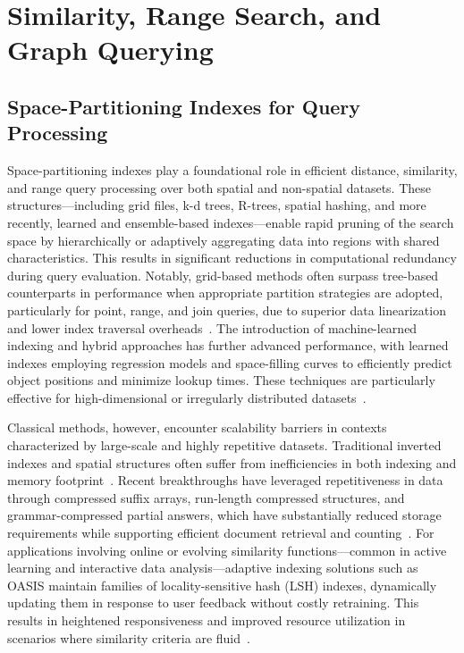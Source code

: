 \section{Similarity, Range Search, and Graph Querying}

\subsection{Space-Partitioning Indexes for Query Processing}

Space-partitioning indexes play a foundational role in efficient distance, similarity, and range query processing over both spatial and non-spatial datasets. These structures—including grid files, k-d trees, R-trees, spatial hashing, and more recently, learned and ensemble-based indexes—enable rapid pruning of the search space by hierarchically or adaptively aggregating data into regions with shared characteristics. This results in significant reductions in computational redundancy during query evaluation. Notably, grid-based methods often surpass tree-based counterparts in performance when appropriate partition strategies are adopted, particularly for point, range, and join queries, due to superior data linearization and lower index traversal overheads~\cite{ref31,ref35}. The introduction of machine-learned indexing and hybrid approaches has further advanced performance, with learned indexes employing regression models and space-filling curves to efficiently predict object positions and minimize lookup times. These techniques are particularly effective for high-dimensional or irregularly distributed datasets~\cite{ref35,ref51,ref54,ref111}.

Classical methods, however, encounter scalability barriers in contexts characterized by large-scale and highly repetitive datasets. Traditional inverted indexes and spatial structures often suffer from inefficiencies in both indexing and memory footprint~\cite{ref75,ref98}. Recent breakthroughs have leveraged repetitiveness in data through compressed suffix arrays, run-length compressed structures, and grammar-compressed partial answers, which have substantially reduced storage requirements while supporting efficient document retrieval and counting~\cite{ref73,ref91}. For applications involving online or evolving similarity functions—common in active learning and interactive data analysis—adaptive indexing solutions such as OASIS maintain families of locality-sensitive hash (LSH) indexes, dynamically updating them in response to user feedback without costly retraining. This results in heightened responsiveness and improved resource utilization in scenarios where similarity criteria are fluid~\cite{ref56,ref111}.

